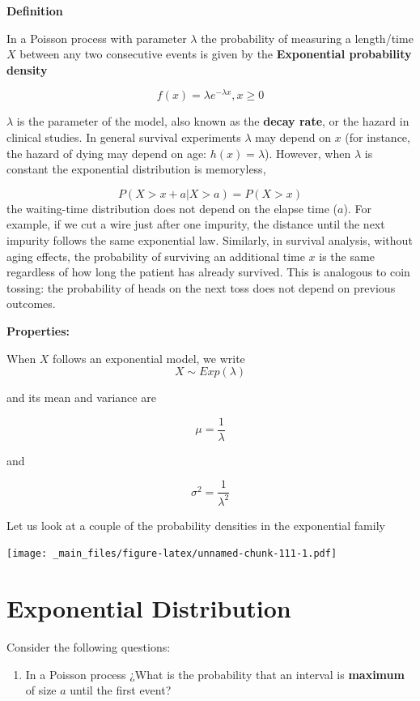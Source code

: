 \documentclass[
]{book}
\providecommand{\tightlist}{%
  \setlength{\itemsep}{0pt}\setlength{\parskip}{0pt}}
\begin{document}
\textbf{Definition}

In a Poisson process with parameter \(\lambda\) the probability of measuring a length/time \(X\) between any two consecutive events is given by the \textbf{Exponential probability density}

\[f(x)=\lambda e^{-\lambda x}, x\geq 0\]

\(\lambda\) is the parameter of the model, also known as the \textbf{decay rate}, or the hazard in clinical studies. In general survival experiments \(\lambda\) may depend on \(x\) (for instance, the hazard of dying may depend on age: \(h(x)=\lambda\)). However, when \(\lambda\) is constant the exponential distribution is memoryless,

\[P(X>x+a|X>a) = P(X>x)\]
the waiting-time distribution does not depend on the elapse time (\(a\)). For example, if we cut a wire just after one impurity, the distance until the next impurity follows the same exponential law. Similarly, in survival analysis, without aging effects, the probability of surviving an additional time \(x\) is the same regardless of how long the patient has already survived. This is analogous to coin tossing: the probability of heads on the next toss does not depend on previous outcomes.

\textbf{Properties:}

When \(X\) follows an exponential model, we write \[X \sim Exp(\lambda)\]

and its mean and variance are

\[\mu=\frac{1}{\lambda}\]

and

\[\sigma^2=\frac{1}{\lambda^2}\]

Let us look at a couple of the probability densities in the exponential family

\texttt{[image: \_main\_files/figure-latex/unnamed-chunk-111-1.pdf]}

\hypertarget{exponential-distribution}{%
\section{Exponential Distribution}\label{exponential-distribution}}

Consider the following questions:

\begin{enumerate}
\def\labelenumi{\arabic{enumi})}
\tightlist
\item
  In a Poisson process ¿What is the probability that an interval is \textbf{maximum} of size \(a\) until the first event?
\end{enumerate}
\end{document}
